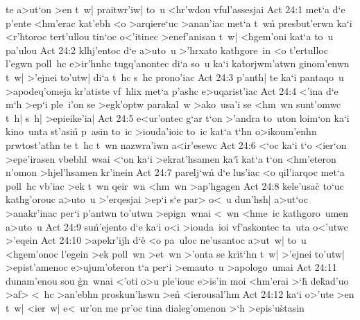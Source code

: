 te
a>ut`on
>en
t~w|
praitwr'iw|
to~u
<hr'wdou
vful'assesjai\bibvsend
\vs Act 24:1
met`a
d`e
p'ente
<hm'erac
kat'ebh
<o
>arqiere`uc
>anan'iac
met`a
t~wn\r{}
presbut'erwn
ka`i
<r'htoroc
tert'ullou
tin`oc
o<'itinec
>enef'anisan
t~w|
<hgem'oni
kat`a
to~u
pa'ulou\bibvsend
\vs Act 24:2
klhj'entoc
d`e
a>uto~u
>'hrxato
kathgore~in
<o
t'ertulloc
l'egwn
poll~hc
e>ir'hnhc
tugq'anontec
di`a
so~u
ka`i
ka\r{t}orjwm'atwn
ginom'enwn
t~w|
>'ejnei
to'utw|
di`a
t~hc
s~hc
prono'iac\bibvsend
\vs Act 24:3
p'anth|
te
ka`i
pantaqo~u
>apodeq'omeja
kr'atiste
vf~hlix
met`a
p'ashc
e>uqarist'iac\bibvsend
\vs Act 24:4
<'ina
d`e
m`h
>ep`i
ple~i'on
se
>egk'optw
parakal~w
>ako~usa'i
se
<hm~wn
sunt'omwc
t~h|
s~h|
>epieike'ia|\bibvsend
\vs Act 24:5
e<ur'ontec
g`ar
t`on
>'andra
to~uton
loim`on
ka`i
kino~unta
st'asi\r{n}
p~asin
to~ic
>iouda'ioic
to~ic
kat`a
t`hn
o>ikoum'enhn
prwtost'athn
te
t~hc
t~wn
nazwra'iwn
a<ir'esewc\bibvsend
\vs Act 24:6
<`oc
ka`i
t`o
<ier`on
>epe'irasen
vbebhl~wsai
<`on
ka`i
>ekrat'hsamen
ka`i\r{}
kat`a
t`on
<hm'eteron
n'omon
>hjel'hsamen
kr'inein\bibvsend
\vs Act 24:7
parelj`wn\r{}
d`e
lus'iac
<o
qil'iarqoc
met`a
poll~hc
vb'iac
>ek
t~wn
qeir~wn
<hm~wn
>ap'hgagen\bibvsend
\vs Act 24:8
kele'usac\r{}
to`uc
kathg'orouc
a>uto~u
>'erqesjai
>ep`i
s`e
par>
o<~u
dun'hsh|
a>ut`oc
>anakr'inac
per`i
p'antwn
to'utwn
>epign~wnai
<~wn
<hme~ic
kathgoro~umen
a>uto~u\bibvsend
\vs Act 24:9
su\r{n}'ejento
d`e
ka`i
o<i
>iouda~ioi
vf'askontec
ta~uta
o<'utwc
>'eqein\bibvsend
\vs Act 24:10
>apekr'ijh
d`e\r{}
<o
pa~uloc
ne'usantoc
a>ut~w|
to~u
<hgem'onoc
l'egein
>ek
poll~wn
>et~wn
>'onta
se
krit`hn
t~w|
>'ejnei
to'utw|
>epist'amenoc
e>ujum'o\r{t}eron
t`a
per`i
>emauto~u
>apologo~umai\bibvsend
\vs Act 24:11
dunam'enou
sou
\r{g}n~wnai
<'oti
o>u
ple'iouc
e>is'in
moi
<hm'erai
>`h\r{}
de\r{k}ad'uo
>af>
<~hc
>an'ebhn
proskun'hswn
>e\r{n}
<ierousal'hm\bibvsend
\vs Act 24:12
ka`i
o>'ute
>en
t~w|
<ier~w|
e<~ur'on
me
pr'oc
tina
dialeg'omenon
>`h
>epis'u\r{s}tasin
